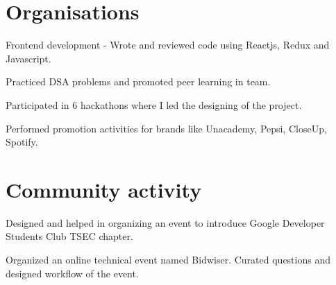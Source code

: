 \documentclass[]{deedy-resume-openfont}
\begin{document}
\begin{minipage}[t]{0.66\textwidth} 


\section{Organisations}

\vspace{\topsep} %
\begin{tightemize}
\item Frontend development - Wrote and reviewed code using Reactjs, Redux and Javascript.
\item Practiced DSA problems and promoted peer learning in team. 
\item Participated in 6 hackathons where I led the designing of the project.
\end{tightemize}
\sectionsep

\begin{tightemize}
\item Performed promotion activities for brands like Unacademy, Pepsi, CloseUp, Spotify.
\end{tightemize}
\sectionsep


\section{Community activity}

\begin{tightemize}
\item Designed and helped in organizing an event to introduce Google Developer Students Club TSEC chapter.
\end{tightemize}
\sectionsep

\begin{tightemize}
\item Organized an online technical event named Bidwiser. Curated questions and designed workflow of the event.
\end{tightemize}
\sectionsep


\end{minipage}
\end{document}
